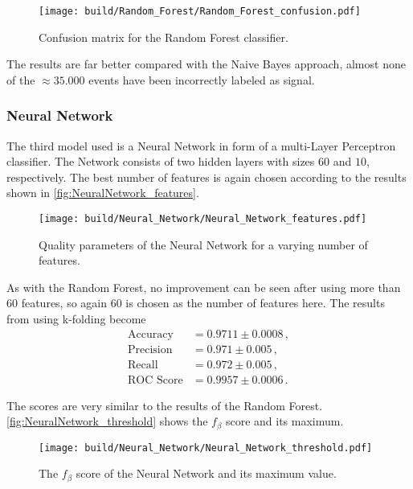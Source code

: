 \begin{figure}[H]
  \centering
  \texttt{[image: build/Random\_Forest/Random\_Forest\_confusion.pdf]}
  \caption{Confusion matrix for the Random Forest classifier.}
  \label{fig:RandomForest_confusion}
\end{figure}

The results are far better compared with the Naive Bayes approach, almost none of the
$\approx 35.000$ events have been incorrectly labeled as signal.

\subsubsection{Neural Network}

The third model used is a Neural Network in form of a multi-Layer Perceptron classifier.
The Network consists of two hidden layers with sizes $60$ and $10$, respectively.
The best number of features is again chosen according to the results shown in
\autoref{fig:NeuralNetwork_features}.

\begin{figure}[H]
  \centering
  \texttt{[image: build/Neural\_Network/Neural\_Network\_features.pdf]}
  \caption{Quality parameters of the Neural Network for a varying number of features.}
  \label{fig:NeuralNetwork_features}
\end{figure}

As with the Random Forest, no improvement can be seen after using more than
$60$ features, so again $60$ is chosen as the number of features here.
The results from using k-folding become
\begin{align*}
  \text{Accuracy} &= 0.9711\pm0.0008 \,, \\
  \text{Precision} &= 0.971\pm0.005 \,, \\
  \text{Recall} &= 0.972\pm0.005 \,, \\
  \text{ROC Score} &= 0.9957\pm0.0006 \,.
\end{align*}

The scores are very similar to the results of the Random Forest.
\autoref{fig:NeuralNetwork_threshold} shows the $f_\beta$ score and its maximum.

\begin{figure}[H]
  \centering
  \texttt{[image: build/Neural\_Network/Neural\_Network\_threshold.pdf]}
  \caption{The $f_\beta$ score of the Neural Network and its maximum value.}
  \label{fig:NeuralNetwork_threshold}
\end{figure}

